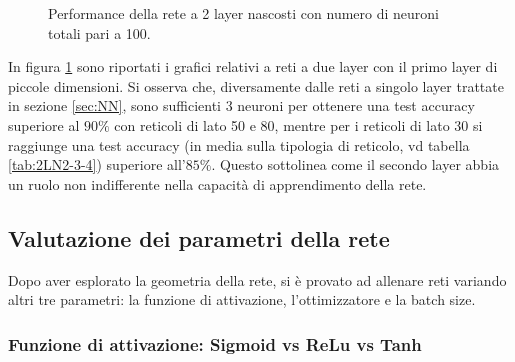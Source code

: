 \documentclass{article}
\begin{document}
\begin{figure}[ht]
\caption{Performance della rete a 2 layer nascosti con numero di neuroni totali pari a 100.}
\label{fig:2L1Lln}
\end{figure}

In figura \ref{fig:2L1Lln} sono riportati i grafici relativi a reti a due layer con il primo layer di piccole dimensioni.
Si osserva che, diversamente dalle reti a singolo layer trattate in sezione \ref{sec:NN}, sono sufficienti 3 neuroni per ottenere una test accuracy superiore al $90\%$ con reticoli di lato 50 e 80, mentre per i reticoli di lato 30 si raggiunge una test accuracy (in media sulla tipologia di reticolo, vd tabella \ref{tab:2LN2-3-4}) superiore all'$85\%$.
Questo sottolinea come il secondo layer abbia un ruolo non indifferente nella capacità di apprendimento della rete.

\subsection{Valutazione dei parametri della rete}
Dopo aver esplorato la geometria della rete, si è provato ad allenare reti variando altri tre parametri: la funzione di attivazione, l'ottimizzatore e la batch size.

\subsubsection{Funzione di attivazione: Sigmoid vs ReLu vs Tanh}
\end{document}
